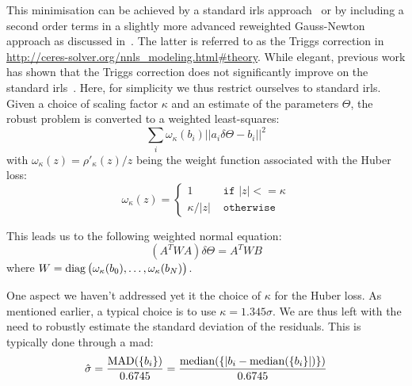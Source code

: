 This minimisation can be achieved by a standard \gls{irls} approach~\cite{Green:JRSSB:1984} or by including a second order terms in a slightly more advanced reweighted Gauss-Newton approach as discussed in~\cite{Triggs:VisAlg:2000}.
The latter is referred to as the Triggs correction in \url{http://ceres-solver.org/nnls_modeling.html#theory}. While elegant, previous work has shown that the Triggs correction does not significantly improve on the standard \gls{irls}~\cite{Zach:ECCV:2014,Zach:ECCV:2018}.
Here, for simplicity we thus restrict ourselves to standard \gls{irls}.
Given a choice of scaling factor $\kappa$ and an estimate of the parameters $\Theta$, the robust problem is converted to a weighted least-squares:
\begin{equation}
\sum_i \omega_\kappa(b_i) ||a_i \delta\Theta - b_i||^2
\end{equation}
with $\omega_\kappa(z) = \rho'_\kappa(z) / z$ being the weight function associated with the Huber loss:
\begin{equation}
\omega_\kappa(z) =
\begin{cases}
  1 &\texttt{ if } |z| <= \kappa \\
  \kappa / |z|  &\texttt{ otherwise }
\end{cases}
\end{equation}

This leads us to the following weighted normal equation:
\begin{equation}
(A^T W A) \delta\Theta = A^T W B
\end{equation}
where $W = \operatorname{diag}\big(\omega_\kappa(b_0), \ldots, \omega_\kappa(b_N)\big)$.

One aspect we haven't addressed yet it the choice of $\kappa$ for the Huber loss. As mentioned earlier, a typical choice is to use $\kappa=1.345\sigma$. We are thus left with the need to robustly estimate the standard deviation of the residuals. This is typically done through a \gls{mad}:
\begin{equation}
\hat{\sigma} = \frac{\operatorname{MAD}(\{b_i\})}{0.6745} = \frac{\operatorname{median}(\{|b_i-\operatorname{median}(\{b_i\}|)\})}{0.6745}
\end{equation}


